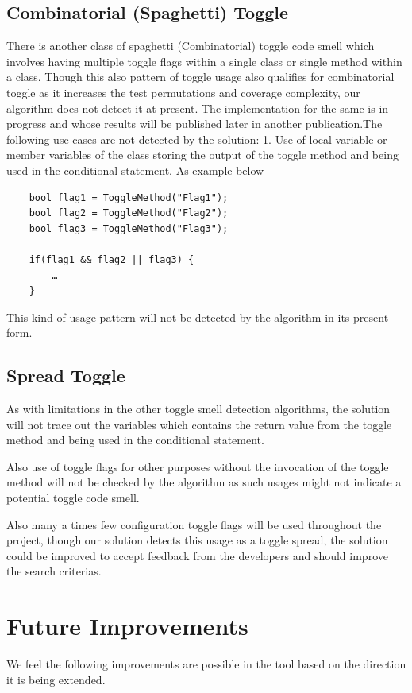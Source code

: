 \documentclass[conference]{IEEEtran}
\begin{document}
\subsection{Combinatorial (Spaghetti) Toggle}
There is another class of spaghetti (Combinatorial) toggle code smell which involves having multiple toggle flags within a single class or single method within a class. Though this also pattern of toggle usage also qualifies for combinatorial toggle as it increases the test permutations and coverage complexity, our algorithm does not detect it at present. The implementation for the same is in progress and whose results will be published later in another publication.The following use cases are not detected by the solution: 
	1. Use of local variable or member variables of the class storing the output of the toggle method and being used in the conditional statement. As example below
\begin{lstlisting}
	bool flag1 = ToggleMethod("Flag1");
	bool flag2 = ToggleMethod("Flag2");
	bool flag3 = ToggleMethod("Flag3");

	if(flag1 && flag2 || flag3) {
		…
	}
\end{lstlisting}
	This kind of usage pattern will not be detected by the algorithm in its present form.
\subsection{Spread Toggle}
	As with limitations in the other toggle smell detection algorithms, the solution will not trace out the variables which contains the return value from the toggle method and being used in the conditional statement. 

Also use of toggle flags for other purposes without the invocation of the toggle method will not be checked by the algorithm as such usages might not indicate a potential toggle code smell.

Also many a times few configuration toggle flags will be used throughout the project, though our solution detects this usage as a toggle spread, the solution could be improved to accept feedback from the developers and should improve the search criterias.

\section{Future Improvements}
\label{Future Improvements}
We feel the following improvements are possible in the tool based on the direction it is being extended.
\end{document}
